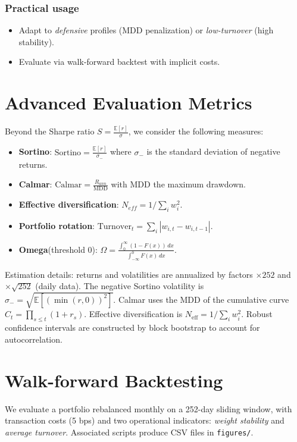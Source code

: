 \documentclass[11pt,a4paper]{article}
\begin{document}
\subsubsection*{Practical usage}
\begin{itemize}
  \item Adapt to \emph{defensive} profiles (MDD penalization) or \emph{low-turnover} (high stability).
  \item Evaluate via walk-forward backtest with implicit costs.
\end{itemize}

\section{Advanced Evaluation Metrics}
Beyond the Sharpe ratio \(S=\frac{\mathbb E[r]}{\sigma}\), we consider the following measures:
\begin{itemize}
  \item \textbf{Sortino}: \(\text{Sortino}=\frac{\mathbb E[r]}{\sigma_{-}}\) where \(\sigma_{-}\) is the standard deviation of negative returns.
  \item \textbf{Calmar}: \(\text{Calmar}=\frac{R_{ann}}{\text{MDD}}\) with \(\text{MDD}\) the maximum drawdown.
  \item \textbf{Effective diversification}: \(N_{eff}=1/\sum_i w_i^2\).
  \item \textbf{Portfolio rotation}: \(\text{Turnover}_t=\sum_i |w_{i,t}-w_{i,t-1}|\).
  \item \textbf{Omega}(threshold 0): \(\Omega=\frac{\int_0^{\infty}(1-F(x))\,dx}{\int_{-\infty}^0 F(x)\,dx}\).
\end{itemize}
\noindent Estimation details: returns and volatilities are annualized by factors \(\times 252\) and \(\times \sqrt{252}\) (daily data). The negative Sortino volatility is \(\sigma_- = \sqrt{\mathbb E[(\min(r,0))^2]}\). Calmar uses the MDD of the cumulative curve \(C_t=\prod_{s\le t}(1+r_s)\). Effective diversification is \(N_{\text{eff}}=1/\sum_i w_i^2\). Robust confidence intervals are constructed by block bootstrap to account for autocorrelation.

\section{Walk-forward Backtesting}
We evaluate a portfolio rebalanced monthly on a 252-day sliding window, with transaction costs (5 bps) and two operational indicators: \emph{weight stability} and \emph{average turnover}. Associated scripts produce CSV files in \texttt{figures/}.
\end{document}
